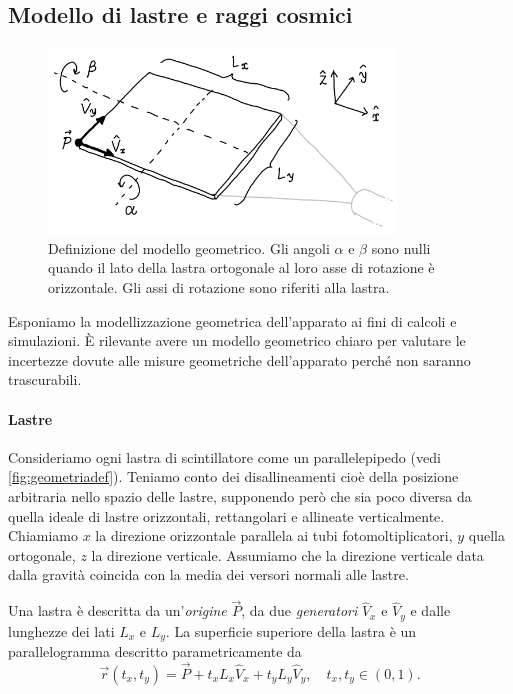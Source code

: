 \subsection{Modello di lastre e raggi cosmici}
\label{sec:teogeom}

\begin{figure}
	\center
	\includegraphics[width=25em]{geometriadef}
	\caption{\label{fig:geometriadef}
	Definizione del modello geometrico.
	Gli angoli $\alpha$ e $\beta$ sono nulli
	quando il lato della lastra ortogonale al loro asse di rotazione è orizzontale.
	Gli assi di rotazione sono riferiti alla lastra.}
\end{figure}

Esponiamo la modellizzazione geometrica dell'apparato ai fini di calcoli e simulazioni.
È rilevante avere un modello geometrico chiaro per valutare le incertezze
dovute alle misure geometriche dell'apparato perché non saranno trascurabili.

\paragraph{Lastre}

Consideriamo ogni lastra di scintillatore come un parallelepipedo (vedi \autoref{fig:geometriadef}).
Teniamo conto dei disallineamenti cioè della posizione arbitraria nello spazio delle lastre,
supponendo però che sia poco diversa da quella ideale di lastre orizzontali, rettangolari e allineate verticalmente.
Chiamiamo $x$ la direzione orizzontale parallela ai tubi fotomoltiplicatori,
$y$ quella ortogonale,
$z$ la direzione verticale.
Assumiamo che la direzione verticale data dalla gravità
coincida con la media dei versori normali alle lastre.

Una lastra è descritta da un'\emph{origine} $\vec P$,
da due \emph{generatori} $\hat V_x$ e $\hat V_y$
e dalle lunghezze dei lati $L_x$ e $L_y$.
La superficie superiore della lastra è un parallelogramma descritto parametricamente da
\begin{equation}
	\label{eq:lastra}
	\vec r(t_x, t_y) = \vec P + t_x L_x \hat V_x + t_y L_y \hat V_y,
	\quad t_x,t_y \in (0,1).
\end{equation}

